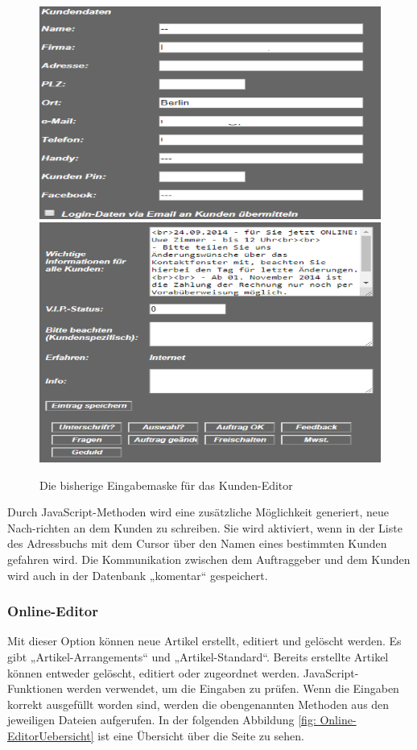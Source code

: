 \pagebreak

\begin{figure}[h]
	\centering
	\includegraphics[width=0.7\linewidth]{Graphics/kundeEditieren.png}
	\includegraphics[width=0.7\linewidth]{Graphics/kundeEditieren1.png}
	\caption[Kundeansicht]{Die bisherige Eingabemaske für das Kunden-Editor}
	\label{fig:KundenEditor}
\end{figure}

Durch JavaScript-Methoden wird eine zusätzliche Möglichkeit generiert, neue Nach-richten an dem Kunden zu schreiben. Sie wird aktiviert, wenn in der Liste des Adressbuchs mit dem Cursor über den Namen eines bestimmten Kunden gefahren wird. Die Kommunikation zwischen dem Auftraggeber und dem Kunden wird auch in der Datenbank „komentar“ gespeichert.

\subsubsection{Online-Editor}

Mit dieser Option können neue Artikel erstellt, editiert und gelöscht werden. Es gibt „Artikel-Arrangements“ und „Artikel-Standard“. Bereits erstellte Artikel können entweder gelöscht, editiert oder zugeordnet werden. JavaScript-Funktionen werden verwendet, um die Eingaben zu prüfen. Wenn die Eingaben korrekt ausgefüllt worden sind, werden die obengenannten Methoden aus den jeweiligen Dateien aufgerufen. In der folgenden Abbildung \ref{fig: Online-EditorUebersicht} ist eine Übersicht über die Seite zu sehen.

